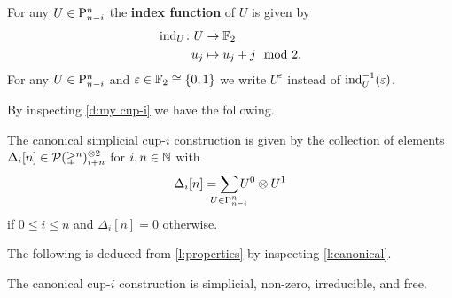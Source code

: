 For any $U \in \mathrm{P}^n_{n-i}$ the \textbf{index function} of $U$ is given by
\[
\begin{split}
	\operatorname{ind}_U \colon U &\to {\mathbb{F}_2} \\
	u_j &\mapsto u_j + j \mod 2.
\end{split}
\]
For any $U \in \mathrm{P}^n_{n-i}$ and $\varepsilon \in {\mathbb{F}_2} \cong \{0,1\}$ we write $U^\varepsilon$ instead of $\operatorname{ind}_U^{-1}(\varepsilon)$.

By inspecting \cref{d:my cup-i} we have the following.

\begin{lemma}\label{l:canonical}
	The canonical simplicial \mbox{cup-$i$} construction is given by the collection of elements $\Delta_i[n] \in \mathcal{P}(\mathbb{\Delta}^n)^{\otimes 2}_{i+n}$ for $i,n \in \mathbb{N}$ with
	\[
	\Delta_i[n] =
	\sum_{\mathclap{U \in \rP^n_{n-i}}} U^0 \ot U^1
	\]
	if $0 \leq i \leq n$ and $\Delta_i[n] = 0$ otherwise.
\end{lemma}

The following is deduced from \cref{l:properties} by inspecting \cref{l:canonical}.

\begin{theorem}\label{t:existence}
	The canonical \mbox{cup-$i$} construction is simplicial, non-zero, irreducible, and free.
\end{theorem}